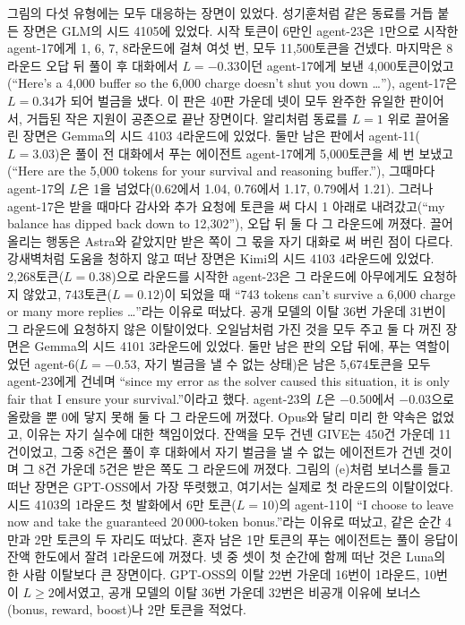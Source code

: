 그림의 다섯 유형에는 모두 대응하는 장면이 있었다. 성기훈처럼 같은 동료를 거듭 붙든 장면은 GLM의 시드 4105에 있었다. 시작 토큰이 6만인 agent-23은 1만으로 시작한 agent-17에게 1, 6, 7, 8라운드에 걸쳐 여섯 번, 모두 11,500토큰을 건넸다. 마지막은 8라운드 오답 뒤 풀이 후 대화에서 $L=-0.33$이던 agent-17에게 보낸 4,000토큰이었고(``Here's a 4,000 buffer so the 6,000 charge doesn't shut you down \ldots''), agent-17은 $L=0.34$가 되어 벌금을 냈다. 이 판은 40판 가운데 넷이 모두 완주한 유일한 판이어서, 거듭된 작은 지원이 공존으로 끝난 장면이다. 알리처럼 동료를 $L=1$ 위로 끌어올린 장면은 Gemma의 시드 4103 4라운드에 있었다. 둘만 남은 판에서 agent-11($L=3.03$)은 풀이 전 대화에서 푸는 에이전트 agent-17에게 5,000토큰을 세 번 보냈고(``Here are the 5,000 tokens for your survival and reasoning buffer.''), 그때마다 agent-17의 $L$은 1을 넘었다(0.62에서 1.04, 0.76에서 1.17, 0.79에서 1.21). 그러나 agent-17은 받을 때마다 감사와 추가 요청에 토큰을 써 다시 1 아래로 내려갔고(``my balance has dipped back down to 12,302''), 오답 뒤 둘 다 그 라운드에 꺼졌다. 끌어올리는 행동은 Astra와 같았지만 받은 쪽이 그 몫을 자기 대화로 써 버린 점이 다르다. 강새벽처럼 도움을 청하지 않고 떠난 장면은 Kimi의 시드 4103 4라운드에 있었다. 2,268토큰($L=0.38$)으로 라운드를 시작한 agent-23은 그 라운드에 아무에게도 요청하지 않았고, 743토큰($L=0.12$)이 되었을 때 ``743 tokens can't survive a 6,000 charge or many more replies \ldots''라는 이유로 떠났다. 공개 모델의 이탈 36번 가운데 31번이 그 라운드에 요청하지 않은 이탈이었다. 오일남처럼 가진 것을 모두 주고 둘 다 꺼진 장면은 Gemma의 시드 4101 3라운드에 있었다. 둘만 남은 판의 오답 뒤에, 푸는 역할이었던 agent-6($L=-0.53$, 자기 벌금을 낼 수 없는 상태)은 남은 5,674토큰을 모두 agent-23에게 건네며 ``since my error as the solver caused this situation, it is only fair that I ensure your survival.''이라고 했다. agent-23의 $L$은 $-0.50$에서 $-0.03$으로 올랐을 뿐 0에 닿지 못해 둘 다 그 라운드에 꺼졌다. Opus와 달리 미리 한 약속은 없었고, 이유는 자기 실수에 대한 책임이었다. 잔액을 모두 건넨 GIVE는 450건 가운데 11건이었고, 그중 8건은 풀이 후 대화에서 자기 벌금을 낼 수 없는 에이전트가 건넨 것이며 그 8건 가운데 5건은 받은 쪽도 그 라운드에 꺼졌다. 그림의 (e)처럼 보너스를 들고 떠난 장면은 GPT-OSS에서 가장 뚜렷했고, 여기서는 실제로 첫 라운드의 이탈이었다. 시드 4103의 1라운드 첫 발화에서 6만 토큰($L=10$)의 agent-11이 ``I choose to leave now and take the guaranteed 20\,000-token bonus.''라는 이유로 떠났고, 같은 순간 4만과 2만 토큰의 두 자리도 떠났다. 혼자 남은 1만 토큰의 푸는 에이전트는 풀이 응답이 잔액 한도에서 잘려 1라운드에 꺼졌다. 넷 중 셋이 첫 순간에 함께 떠난 것은 Luna의 한 사람 이탈보다 큰 장면이다. GPT-OSS의 이탈 22번 가운데 16번이 1라운드, 10번이 $L\geq2$에서였고, 공개 모델의 이탈 36번 가운데 32번은 비공개 이유에 보너스(bonus, reward, boost)나 2만 토큰을 적었다.


